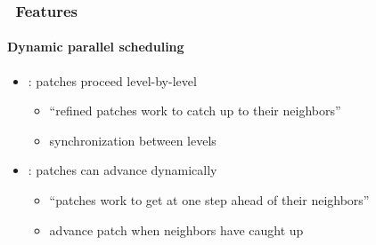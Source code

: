 \begin{frame}[fragile] 
\frametitle{\cello\ Features}
\framesubtitle{Dynamic parallel scheduling}
\begin{itemize}
\item{}\enzo: patches proceed level-by-level
\begin{itemize}
\item{}   ``refined patches work to catch up to their neighbors''
\item{}   synchronization between levels
\end{itemize}
\item{}\cello: patches can advance dynamically
\begin{itemize}
\item{}   ``patches work to get at one step ahead of their neighbors''
\item{}     advance patch when neighbors have caught up
\end{itemize}
\end{itemize}
\end{frame}
